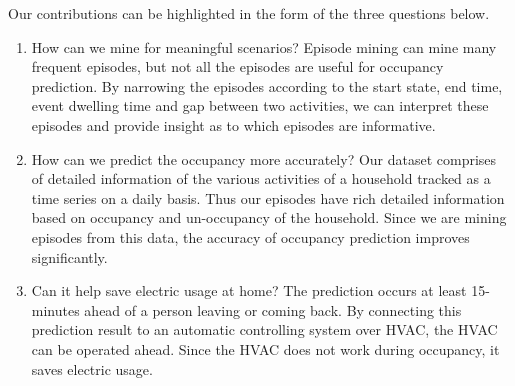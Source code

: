 Our contributions can be highlighted in the form of the three questions below. 
\begin{enumerate}
\item How can we mine for meaningful scenarios? 
Episode mining can mine many frequent episodes, but not all the episodes are useful 
for occupancy prediction. 
By narrowing the episodes according to the start state, 
end time, event dwelling time and gap between two activities, 
we can interpret these episodes and provide insight as to 
which episodes are informative. 
\item How can we predict the occupancy more accurately?
Our dataset comprises of detailed information of the various activities of a household 
tracked as a time series on a daily basis. 
Thus our episodes have rich detailed information based on occupancy and 
un-occupancy of the household. 
Since we are mining episodes from this data, 
the accuracy of occupancy prediction improves significantly. 
\item  Can it help save electric usage at home?
The prediction occurs at least 15-minutes ahead of a person 
leaving or coming back. 
By connecting this prediction result to an automatic controlling system 
over HVAC, the HVAC can be operated ahead. 
Since the HVAC does not work during occupancy, 
it saves electric usage. 
\end{enumerate}

\iffalse
Next, 
we first discuss the time-gap constraint episode mining 
model and the mixture model, 
and how to predict the target event in section 4. 
Then, 
in section 5 we will show 
the experimental results. 
\fi









